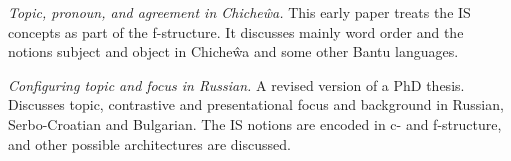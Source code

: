 \documentclass[output=paper,hidelinks]{langscibook}
\begin{document}
 \vspace{+6pt} 
 
\citet{BM87} \textit{Topic, pronoun, and agreement in Chiche\^wa.} This early paper treats the IS concepts as part of the f-structure. It discusses mainly word order and the notions subject and object in Chiche\^wa and some other Bantu languages.


\vspace{+6pt}  
 \citet{King95} \textit{Configuring topic and focus in Russian.} A revised version of a PhD thesis. Discusses topic, contrastive and presentational focus and background in Russian, Serbo-Croatian and Bulgarian. The IS notions are encoded in c- and f-structure, and other possible architectures are discussed. 
 
\end{document}
